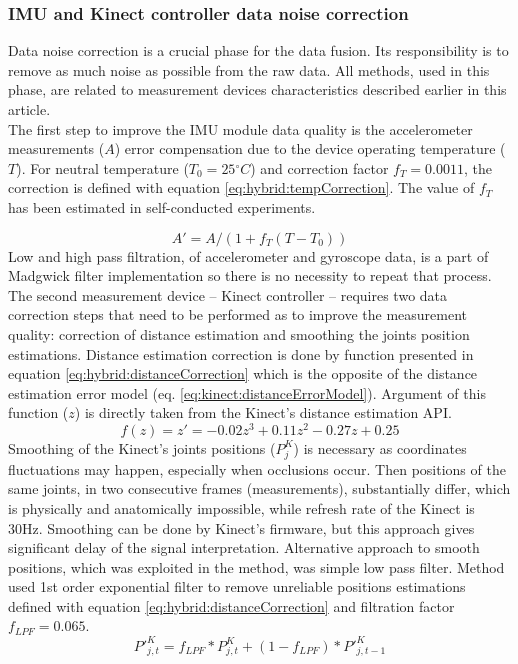 \documentclass[sensors,article,submit,moreauthors,pdftex,10pt,a4paper]{mdpi}
\newcommand{\degree}{\ensuremath{{}^{\circ}}\xspace}
\begin{document}
\subsubsection{IMU and Kinect controller data noise correction}
Data noise correction is a crucial phase for the data fusion. Its responsibility is to remove as much noise as possible from the raw data. All methods, used in this phase, are related to measurement devices characteristics described earlier in this article.\\
The first step to improve the IMU module data quality is the accelerometer measurements ($A$) error compensation due to the device operating temperature ($T$). For neutral temperature ($T_0=25\degree C$) and correction factor $f_T= 0.0011$, the correction is defined with equation \ref{eq:hybrid:tempCorrection}. The value of $f_T$ has been estimated in self-conducted experiments.

\begin{equation}
	A'=A/(1+ f_T (T-T_0))
	\label{eq:hybrid:tempCorrection}
\end{equation}
Low and high pass filtration, of accelerometer and gyroscope data, is a part of Madgwick filter implementation so there is no necessity to repeat that process.
The second measurement device – Kinect controller – requires two data correction steps that need to be performed as to improve the measurement quality: correction of distance estimation and smoothing the joints position estimations. Distance estimation correction is done by function presented in equation \ref{eq:hybrid:distanceCorrection} which is the opposite of the distance estimation error model (eq. \ref{eq:kinect:distanceErrorModel}). Argument of this function ($z$) is directly taken from the Kinect’s distance estimation API.
\begin{equation}
	f(z)=z'=-0.02z^3+0.11z^2-0.27z+0.25
	\label{eq:hybrid:distanceCorrection}
\end{equation}
Smoothing of the Kinect’s joints positions ($P_j^K$) is necessary as coordinates fluctuations may happen, especially when occlusions occur. Then positions of the same joints, in two consecutive frames (measurements), substantially differ, which is physically and anatomically impossible, while refresh rate of the Kinect is 30Hz. Smoothing can be done by Kinect’s firmware, but this approach gives significant delay of the signal interpretation. Alternative approach to smooth positions, which was exploited in the method, was simple low pass filter. Method used 1st order exponential filter to remove unreliable positions estimations defined with equation \ref{eq:hybrid:distanceCorrection} and filtration factor $f_{LPF} = 0.065$.
\begin{equation}
	{P'}_{j,t}^K=f_{LPF} * P_{j,t}^K+(1-f_{LPF}) * {P'}_{j,t-1}^K
	\label{eq:hybrid:distanceCorrection}
\end{equation}
\end{document}
